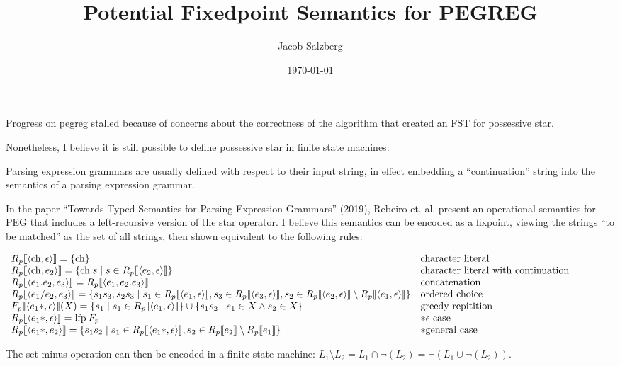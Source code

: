 \documentclass[10pt]{article}
\author {Jacob Salzberg}
\date{\today}
\title{Potential Fixedpoint Semantics for PEGREG}
\newcommand{\lfp}{{\kern-0.20em}\mathbin{\mbox{lfp}}}
\begin{document}
\maketitle

Progress on pegreg stalled because of concerns about the correctness of the algorithm that created an FST for possessive star.

Nonetheless, I believe it is still possible to define possessive star in finite state machines:

Parsing expression grammars are usually defined with respect to their input string, in effect embedding a ``continuation'' string into the semantics of a parsing expression grammar.

In the paper ``Towards Typed Semantics for Parsing Expression Grammars'' (2019), Rebeiro et. al. present an operational semantics for PEG that includes a left-recursive version of the
star operator. I believe this semantics can be encoded as a fixpoint, viewing the strings ``to be matched'' as the set of all strings, then shown equivalent to the following rules:

\begin{center}
$
  \begin{array}{l l}
    R_p \llbracket \langle \mbox{ch}, \epsilon \rangle \rrbracket = \{ \mbox{ch} \} & \mbox{character literal} \\
    R_p \llbracket \langle \mbox{ch}, e_2 \rangle \rrbracket = \{ \mbox{ch}.s \mid s \in R_p \llbracket \langle e_2, \epsilon \rangle \rrbracket \} & \mbox{character literal with continuation} \\
    R_p \llbracket \langle e_1.e_2, e_3 \rangle \rrbracket = R_p \llbracket \langle e_1, e_2.e_3 \rangle \rrbracket & \mbox{concatenation} \\
    R_p \llbracket \langle e_1/e_2, e_3 \rangle \rrbracket = \{ s_1s_3, s_2s_3 \mid s_1 \in R_p \llbracket \langle e_1, \epsilon \rangle \rrbracket, s_3 \in R_p \llbracket \langle e_3, \epsilon \rangle \rrbracket, s_2 \in R_p \llbracket \langle e_2, \epsilon \rangle \rrbracket \setminus R_p \llbracket \langle e_1, \epsilon \rangle \rrbracket \} & \mbox{ordered choice} \\
    F_p \llbracket \langle e_1\ast, \epsilon \rangle \rrbracket(X) = \{s_1 \mid s_1 \in R_p \llbracket \langle e_1, \epsilon \rangle \rrbracket \} \cup \{s_1s_2 \mid s_1 \in X \land s_2 \in X \} & \mbox{greedy repitition} \\
    R_p \llbracket \langle e_1\ast, \epsilon\rangle \rrbracket = \lfp F_p & \ast \epsilon\mbox{-case} \\
    R_p \llbracket \langle e_1\ast, e_2 \rangle \rrbracket = \{s_1s_2 \mid s_1 \in R_p \llbracket \langle e_1\ast, \epsilon \rangle \rrbracket, s_2 \in R_p \llbracket e_2 \rrbracket \setminus R_p \llbracket e_1 \rrbracket \} & \ast \mbox{general case} \\
  \end{array}
$
\end{center}

The set minus operation can then be encoded in a finite state machine: $L_1 \setminus L_2 = L_1 \cap \neg(L_2) = \neg(L_1 \cup \neg(L_2))$.
\end{document}
